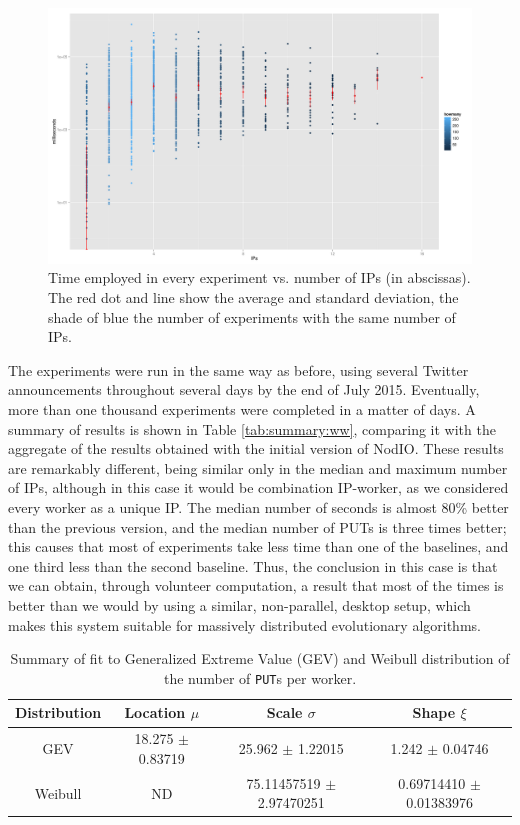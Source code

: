\documentclass[journal,onecolumn]{IEEEtran}
\begin{document}
%
\begin{figure}[!htb]
\centering
\includegraphics[width=0.9\linewidth]{ips-time-ww.png}
\caption{Time employed in every experiment vs. number of IPs (in
  abscissas). The red dot and line show the average and standard
  deviation, the shade of blue the number of experiments with the same
  number of IPs. } 
\label{fig:ipstime:w2}
\end{figure}

The experiments were run in the same way as before, using several
Twitter announcements throughout several days by the end of July
2015. Eventually, more than one thousand experiments were completed in
a matter of days. A summary of results is shown in Table
\ref{tab:summary:ww}, comparing it with the aggregate of the results
obtained with the initial version of {\sf NodIO}. These results are
remarkably different, being similar only in the median and maximum
number of IPs, although in this case it would be combination
IP-worker, as we considered every worker as a unique IP. The median
number of seconds is almost 80\% better than the previous version, and
the median number of PUTs is three times better; this causes that most
of experiments take less time than one of the baselines, and one third
less than the second baseline. Thus, the conclusion in this case is
that we can obtain, through volunteer computation, a result that most of the times is better than we would by using a similar, non-parallel,
desktop setup, which makes this system suitable for massively
distributed evolutionary algorithms.
%
\begin{table}
\caption{Summary of fit to Generalized Extreme Value (GEV) and Weibull distribution of
  the number of {\tt PUT}s per worker. \label{tab:puts:ww}}
\begin{center}
\begin{tabular}{cccc}
\hline
Distribution & Location $\mu$ & Scale $\sigma$ & Shape $\xi$ \\
\hline
GEV & 18.275 $\pm$ 0.83719  &  25.962  $\pm$ 1.22015 & 1.242   $\pm$
0.04746 \\
Weibull & ND & 75.11457519 $\pm$ 2.97470251  & 0.69714410 $\pm$ 0.01383976 \\
\hline
\end{tabular}
\end{center}
\end{table}
%
\end{document}
